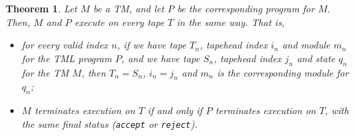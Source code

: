 \documentclass{article}
\newtheorem{theorem}{Theorem}[section]
\begin{document}
    \begin{theorem} \label{thm:TM_to_TMP}
        Let $M$ be a TM, and let $P$ be the corresponding program for $M$. Then, $M$ and $P$ execute on every tape $T$ in the same way. That is, 
        \begin{itemize}
            \item for every valid index $n$, if we have tape $T_n$, tapehead index $i_n$ and module $m_n$ for the TML program $P$, and we have tape $S_n$, tapehead index $j_n$ and state $q_n$ for the TM $M$, then $T_n = S_n$, $i_n = j_n$ and $m_n$ is the corresponding module for $q_n$;
            \item $M$ terminates execution on $T$ if and only if $P$ terminates execution on $T$, with the same final status (\texttt{accept} or \texttt{reject}).
        \end{itemize}
    \end{theorem}
\end{document}
